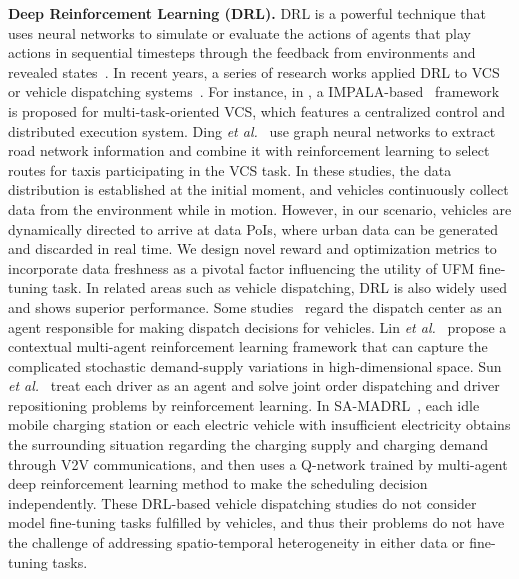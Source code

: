 \noindent\textbf{Deep Reinforcement Learning (DRL).}
DRL is a powerful technique that uses neural networks to simulate or evaluate the actions of agents that play actions in sequential timesteps through the feedback from environments and revealed states~\cite{introduce_drl}. In recent years, a series of research works applied DRL to VCS or vehicle dispatching systems~\cite{TITS22}. For instance, in \cite{INFO20}, a 
IMPALA-based~\cite{espeholt2018impala} framework is proposed for multi-task-oriented VCS, which features a centralized control and distributed execution system. Ding \emph{et al.}~\cite{INFO21VEHICLES} use graph neural networks to extract road network information and combine it with reinforcement learning to select routes for taxis participating in the VCS task. In these studies, the data distribution is established at the initial moment, and vehicles continuously collect data from the environment while in motion. However, in our scenario, vehicles are dynamically directed to arrive at data PoIs, where urban data can be generated and discarded in real time. We design novel reward and optimization metrics to incorporate data freshness as a pivotal factor influencing the utility of UFM fine-tuning task. In related areas such as vehicle dispatching, DRL is also widely used and shows superior performance. Some studies~\cite{INFO18, TITS20} regard the dispatch center as an agent responsible for making dispatch decisions for vehicles. Lin \emph{et al.}~\cite{KDD18} propose a contextual multi-agent reinforcement learning framework that can capture the complicated stochastic demand-supply variations in high-dimensional space. Sun \emph{et al.}~\cite{KDD22} treat each driver as an agent and solve joint order dispatching and driver repositioning problems by reinforcement learning. 
In SA-MADRL~\cite{liu2024multi}, each idle mobile charging station or each electric vehicle with insufficient electricity obtains the surrounding situation regarding the charging supply and charging demand through V2V communications, and then uses a Q-network trained by multi-agent deep reinforcement learning method to make the scheduling decision independently.
These DRL-based vehicle dispatching studies do not consider model fine-tuning tasks fulfilled by vehicles, and thus their problems do not have the challenge of addressing spatio-temporal heterogeneity in either data or fine-tuning tasks.

